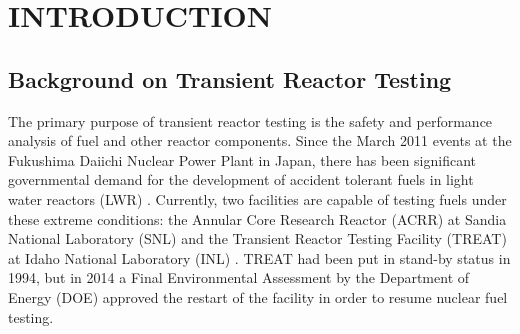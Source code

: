 %
%
%



\pagestyle{plain} %
\setcounter{page}{1}


\chapter{\uppercase{Introduction}}

\section{Background on Transient Reactor Testing}

The primary purpose of transient reactor testing is the safety and performance analysis of fuel and other reactor components. Since the March 2011 events at the Fukushima Daiichi Nuclear Power Plant in Japan, there has been significant governmental demand for the development of accident tolerant fuels in light water reactors (LWR) \cite{ConRepTREAT}.  Currently, two facilities are capable of testing fuels under these extreme conditions: the Annular Core Research Reactor (ACRR) at Sandia National Laboratory (SNL) and the Transient Reactor Testing Facility (TREAT) at Idaho National Laboratory (INL) \cite{SandiaTREAT}. TREAT had been put in stand-by status in 1994, but in 2014 a Final Environmental Assessment by the Department of Energy (DOE) approved the restart of the facility in order to resume nuclear fuel testing\cite{FONSI}. 

